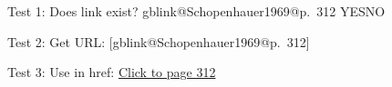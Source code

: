 \documentclass{article}
\makeatletter
\newcommand{\getgblink}[2]{\csname gblink@#1@#2\endcsname}
\newcommand{\ifgblink}[2]{%
  \ifcsname gblink@#1@#2\endcsname
    \expandafter\@firstoftwo
  \else
    \expandafter\@secondoftwo
  \fi
}
\makeatother
\begin{document}
Test 1: Does link exist?
\ifgblink{Schopenhauer1969}{p.~312}{YES}{NO}

Test 2: Get URL:
[\getgblink{Schopenhauer1969}{p.~312}]

Test 3: Use in href:
\href{\getgblink{Schopenhauer1969}{p.~312}}{Click to page 312}
\end{document}
